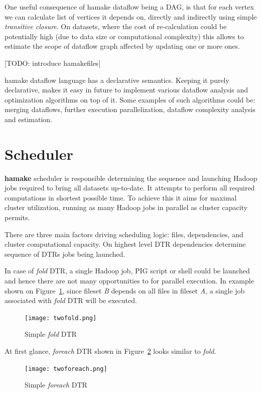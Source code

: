 \documentclass[10pt,conference,letterpaper]{IEEEtran}
\begin{document}
One useful consequence of hamake dataflow being a DAG, is that for
each vertex we can calculate list of vertices it depends on, directly
and indirectly using simple \textit{transitive closure}. On datasets,
where the cost of re-calculation could be potentially high (due to
data size or computational complexity) this allows to estimate the
scope of dataflow graph affected by updating one or more ones.

[TODO: introduce hamakefiles]

hamake dataflow language has a declarative semantics. Keeping it
purely declarative, makes it easy in future to implement various
dataflow analysis and optimization algorithms on top of it. Some
examples of such algorithms could be: merging dataflows, further
execution parallelization, dataflow complexity analysis and
estimation.

\section{Scheduler}

\textbf{hamake} scheduler is responsible determining the sequence and
launching Hadoop jobs required to bring all datasets up-to-date.  It
attempts to perform all required computations in shortest possible
time. To achieve this it aims for maximal cluster utilization, running
as many Hadoop jobs in parallel as cluster capacity permits.

There are three main factors driving scheduling logic: files,
dependencies, and cluster computational capacity. On highest level DTR
dependencies determine sequence of DTRs jobs being launched.

In case of \emph{fold} DTR, a single Hadoop job, PIG script or shell
could be launched and hence there are not many opportunities to for
parallel execution. In example shown on Figure~\ref{fig:fold1}, since
fileset \textit{B} depends on all files in fileset \textit{A}, a
single job associated with \emph{fold} DTR will be executed.

\begin{figure}[htp]
\centering
\texttt{[image: twofold.png]}
\caption{Simple \emph{fold} DTR}
\label{fig:fold1}
\end{figure}

At first glance, \emph{foreach} DTR shown in Figure~\ref{fig:foreach1}
looks similar to \emph{fold}.

\begin{figure}[htp]
\centering
\texttt{[image: twoforeach.png]}
\caption{Simple \emph{foreach} DTR}
\label{fig:foreach1}
\end{figure}
\end{document}
